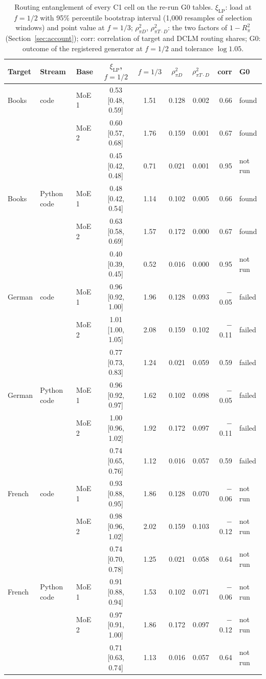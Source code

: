 \begin{table}[t]
\centering
\caption{Routing entanglement of every C1 cell on the re-run G0 tables. $\xi_{\mathrm{LP}}$: load at $f=1/2$ with 95\% percentile bootstrap interval (1,000 resamples of selection windows) and point value at $f=1/3$; $\rho^2_{\pi D}$, $\rho^2_{\pi T\cdot D}$: the two factors of $1-R^2_\pi$ (Section~\ref{sec:account}); corr: correlation of target and DCLM routing shares; G0: outcome of the registered generator at $f=1/2$ and tolerance $\log1.05$.}
\label{tab:entfull}
\footnotesize
\begin{tabular}{@{}lllccccrl@{}}
\toprule
Target & Stream & Base & $\xi_{\mathrm{LP}}$, $f=1/2$ & $f=1/3$ & $\rho^2_{\pi D}$ & $\rho^2_{\pi T\cdot D}$ & corr & G0\\
\midrule
Books & code & MoE 1 & 0.53 [0.48, 0.59] & 1.51 & 0.128 & 0.002 & 0.66 & found\\
 &  & MoE 2 & 0.60 [0.57, 0.68] & 1.76 & 0.159 & 0.001 & 0.67 & found\\
 &  & \nestor{} & 0.45 [0.42, 0.48] & 0.71 & 0.021 & 0.001 & 0.95 & not run\\
\addlinespace[2pt]
Books & Python code & MoE 1 & 0.48 [0.42, 0.54] & 1.14 & 0.102 & 0.005 & 0.66 & found\\
 &  & MoE 2 & 0.63 [0.58, 0.69] & 1.57 & 0.172 & 0.000 & 0.67 & found\\
 &  & \nestor{} & 0.40 [0.39, 0.45] & 0.52 & 0.016 & 0.000 & 0.95 & not run\\
\addlinespace[2pt]
German & code & MoE 1 & 0.96 [0.92, 1.00] & 1.96 & 0.128 & 0.093 & $-$0.05 & failed\\
 &  & MoE 2 & 1.01 [1.00, 1.05] & 2.08 & 0.159 & 0.102 & $-$0.11 & failed\\
 &  & \nestor{} & 0.77 [0.73, 0.83] & 1.24 & 0.021 & 0.059 & 0.59 & failed\\
\addlinespace[2pt]
German & Python code & MoE 1 & 0.96 [0.92, 0.97] & 1.62 & 0.102 & 0.098 & $-$0.05 & failed\\
 &  & MoE 2 & 1.00 [0.96, 1.02] & 1.92 & 0.172 & 0.097 & $-$0.11 & failed\\
 &  & \nestor{} & 0.74 [0.65, 0.76] & 1.12 & 0.016 & 0.057 & 0.59 & failed\\
\addlinespace[2pt]
French & code & MoE 1 & 0.93 [0.88, 0.95] & 1.86 & 0.128 & 0.070 & $-$0.06 & not run\\
 &  & MoE 2 & 0.98 [0.96, 1.02] & 2.02 & 0.159 & 0.103 & $-$0.12 & not run\\
 &  & \nestor{} & 0.74 [0.70, 0.78] & 1.25 & 0.021 & 0.058 & 0.64 & not run\\
\addlinespace[2pt]
French & Python code & MoE 1 & 0.91 [0.88, 0.94] & 1.53 & 0.102 & 0.071 & $-$0.06 & not run\\
 &  & MoE 2 & 0.97 [0.91, 1.00] & 1.86 & 0.172 & 0.097 & $-$0.12 & not run\\
 &  & \nestor{} & 0.71 [0.63, 0.74] & 1.13 & 0.016 & 0.057 & 0.64 & not run\\
\bottomrule
\end{tabular}
\end{table}
